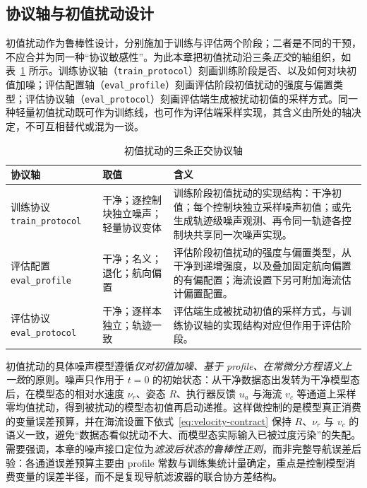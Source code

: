 \subsection{协议轴与初值扰动设计}
\label{subsec:protocol-axes}

初值扰动作为鲁棒性设计，分别施加于训练与评估两个阶段；二者是不同的干预，不应合并为同一种“协议敏感性”。为此本章把初值扰动沿三条\emph{正交}的轴组织，如表~\ref{tab:protocol-axes} 所示。训练协议轴（\texttt{train\_protocol}）刻画训练阶段是否、以及如何对块初值加噪；评估配置轴（\texttt{eval\_profile}）刻画评估阶段初值扰动的强度与偏置类型；评估协议轴（\texttt{eval\_protocol}）刻画评估端生成被扰动初值的采样方式。同一种轻量初值扰动既可作为训练线，也可作为评估端采样实现，其含义由所处的轴决定，不可互相替代或混为一谈。

\begin{table}[htbp]
  \centering
  \caption{初值扰动的三条正交协议轴}
  \label{tab:protocol-axes}
  \small
  \begin{tabularx}{\textwidth}{>{\raggedright\arraybackslash}p{}>{\raggedright\arraybackslash}p{}>{\raggedright\arraybackslash}X}
    \toprule
    协议轴 & 取值 & 含义 \\
    \midrule
    训练协议 \texttt{train\_protocol} & 干净；逐控制块独立噪声；轻量协议变体 & 训练阶段初值扰动的实现结构：干净初值；每个控制块独立采样噪声初值；或先生成轨迹级噪声观测、再令同一轨迹各控制块共享同一次噪声实现。 \\
    评估配置 \texttt{eval\_profile} & 干净；名义；退化；航向偏置 & 评估阶段初值扰动的强度与偏置类型，从干净到递增强度，以及叠加固定航向偏置的有偏配置；海流设置下另可附加海流估计偏置配置。 \\
    评估协议 \texttt{eval\_protocol} & 干净；逐样本独立；轨迹一致 & 评估端生成被扰动初值的采样方式，与训练协议轴的实现结构对应但作用于评估阶段。 \\
    \bottomrule
  \end{tabularx}
\end{table}

初值扰动的具体噪声模型遵循\emph{仅对初值加噪、基于 profile、在常微分方程语义上一致}的原则。噪声只作用于 \(t=0\) 的初始状态：从干净数据态出发转为干净模型态后，在模型态的相对水速度 \(\nu_r\)、姿态 \(R\)、执行器反馈 \(u_a\) 与海流 \(v_c\) 等通道上采样零均值扰动，得到被扰动的模型态初值再启动递推。这样做控制的是模型真正消费的变量误差预算，并在海流设置下依式~\eqref{eq:velocity-contract} 保持 \(R\)、\(\nu_r\) 与 \(v_c\) 的语义一致，避免“数据态看似扰动不大、而模型态实际输入已被过度污染”的失配。需要强调，本章的噪声接口定位为\emph{滤波后状态的鲁棒性正则}，而非完整导航误差后验：各通道误差预算主要由 profile 常数与训练集统计量确定，重点是控制模型消费变量的误差半径，而不是复现导航滤波器的联合协方差结构。


